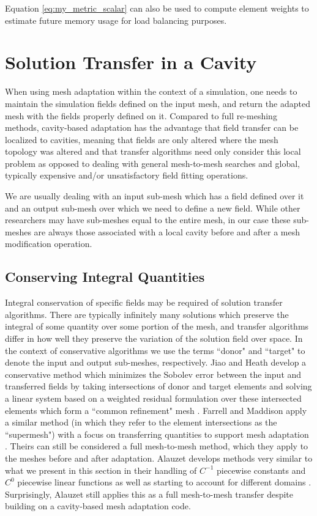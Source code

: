 Equation \ref{eq:my_metric_scalar} can also be used to compute element weights
to estimate future memory usage for load balancing purposes.

\section{Solution Transfer in a Cavity}

When using mesh adaptation within the context of a simulation,
one needs to maintain the simulation fields defined on the input mesh,
and return the adapted mesh with the fields properly defined on it.
Compared to full re-meshing methods, cavity-based adaptation has the
advantage that field transfer can be localized to cavities, meaning
that fields are only altered where the mesh topology was altered and
that transfer algorithms need only consider this local problem
as opposed to dealing with general mesh-to-mesh searches and
global, typically expensive and/or unsatisfactory field fitting operations.

We are usually dealing with an input sub-mesh which has a field defined
over it and an output sub-mesh over which we need to define a new
field.
While other researchers may have sub-meshes equal to the entire mesh,
in our case these sub-meshes are always those associated with
a local cavity before and after a mesh modification operation.

\subsection{Conserving Integral Quantities}

Integral conservation of specific fields may be required of
solution transfer algorithms.
There are typically infinitely many solutions which preserve the
integral of some quantity over some portion of the mesh, and
transfer algorithms differ in how well they preserve the variation
of the solution field over space.
In the context of conservative algorithms we use the terms
``donor" and ``target" to denote the input and output sub-meshes,
respectively.
Jiao and Heath develop a conservative method which minimizes
the Sobolev error between the input and transferred fields
by taking intersections of donor and target elements and
solving a linear system based on a weighted residual formulation
over these intersected elements which form a ``common refinement" mesh
\cite{jiao2004common}.
Farrell and Maddison apply a similar method (in which they refer
to the element intersections as the ``supermesh") with a focus
on transferring quantities to support mesh adaptation \cite{farrell2009conservative}.
Theirs can still be considered a full mesh-to-mesh method, which
they apply to the meshes before and after adaptation.
Alauzet develops methods very similar to what we present in this
section in their handling of $C^{-1}$
piecewise constants and $C^0$ piecewise linear functions as well
as starting to account for different domains \cite{alauzet2016parallel}.
Surprisingly, Alauzet still applies this as a full mesh-to-mesh transfer
despite building on a cavity-based mesh adaptation code.

